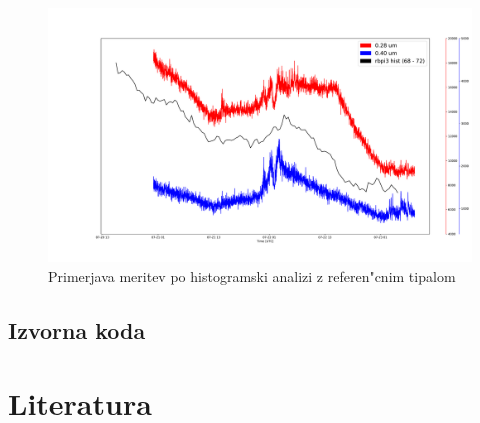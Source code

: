 \documentclass[11pt,a4paper]{article}
\begin{document}
\begin{figure}[H]
	\begin{center}
		\includegraphics[width=16cm]{hist_comparison.pdf}
		\caption{Primerjava meritev po histogramski analizi z referen"cnim tipalom}
		\label{hist_comparison}
	\end{center}
\end{figure}

\clearpage

\begin{appendices}
	\section{Izvorna koda}
\end{appendices}
\clearpage

\section{Literatura}
\printbibliography[heading=none]
\end{document}
